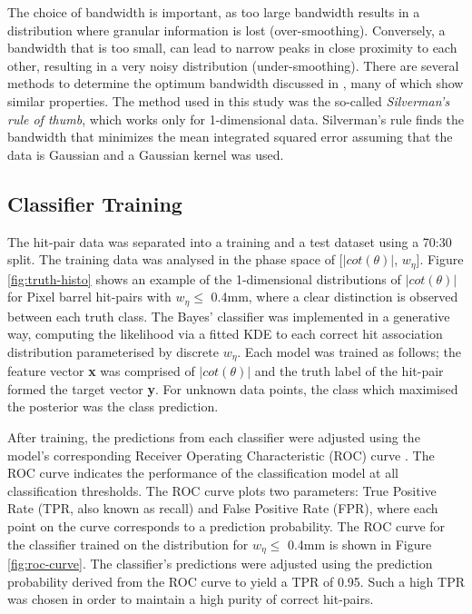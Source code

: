 The choice of bandwidth is important, as too large bandwidth results in a distribution where granular information is lost (over-smoothing). Conversely, a bandwidth that is too small, can lead to narrow peaks in close proximity to each other, resulting in a very noisy distribution (under-smoothing). There are several methods to determine the optimum bandwidth discussed in \cite{bandwidth-selection-methods}, many of which show similar properties. The method used in this study was the so-called \textit{Silverman's rule of thumb}, which works only for 1-dimensional data. Silverman's rule finds the bandwidth that minimizes the mean integrated squared error assuming that the data is Gaussian and a Gaussian kernel was used.

\newpage
\subsection{Classifier Training}

The hit-pair data was separated into a training and a test dataset using a 70:30 split. The training data was analysed in the phase space of [$|cot(\theta)|$, $w_{\eta}$]. Figure \ref{fig:truth-histo} shows an example of the 1-dimensional distributions of $|cot(\theta)|$ for Pixel barrel hit-pairs with $w_{\eta} \le$ 0.4mm, where a clear distinction is observed between each truth class. The Bayes’ classifier was implemented in a generative way, computing the likelihood via a fitted KDE to each correct hit association distribution parameterised by discrete $w_{\eta}$. Each model was trained as follows; the feature vector \textbf{x} was comprised of $|cot(\theta)|$ and the truth label of the hit-pair formed the target vector \textbf{y}. For unknown data points, the class which maximised the posterior was the class prediction.

After training, the predictions from each classifier were adjusted using the model's corresponding Receiver Operating Characteristic (ROC) curve \cite{Davis2006-oh}. The ROC curve indicates the performance of the classification model at all classification thresholds. The ROC curve plots two parameters: True Positive Rate (TPR, also known as recall) and False Positive Rate (FPR), where each point on the curve corresponds to a prediction probability. The ROC curve for the classifier trained on the distribution for $w_{\eta} \le$ 0.4mm is shown in Figure \ref{fig:roc-curve}. The classifier’s predictions were adjusted using the prediction probability derived from the ROC curve to yield a TPR of 0.95. Such a high TPR was chosen in order to maintain a high purity of correct hit-pairs. 

